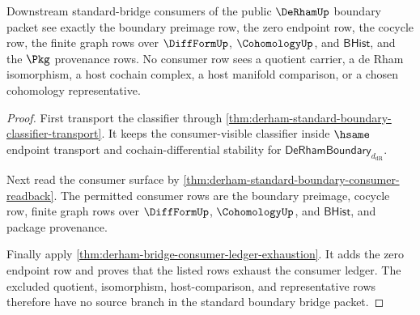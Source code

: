 \begin{theorem}
\label{thm:derham-root-standard-bridge-consumer-threshold}
Downstream standard-bridge consumers of the public $\DeRhamUp$ boundary packet
see exactly the boundary preimage row, the zero endpoint row, the cocycle row,
the finite graph rows over $\DiffFormUp$, $\CohomologyUp$, and $\mathsf{BHist}$,
and the $\Pkg$ provenance rows. No consumer row sees a quotient carrier, a de
Rham isomorphism, a host cochain complex, a host manifold comparison, or a
chosen cohomology representative.
\end{theorem}
\begin{proof}
First transport the classifier through
\autoref{thm:derham-standard-boundary-classifier-transport}. It keeps the
consumer-visible classifier inside $\hsame$ endpoint transport and
cochain-differential stability for
$\mathsf{DeRhamBoundary}_{d_{\mathrm{dR}}}$.

Next read the consumer surface by
\autoref{thm:derham-standard-boundary-consumer-readback}. The permitted
consumer rows are the boundary preimage, cocycle row, finite graph rows over
$\DiffFormUp$, $\CohomologyUp$, and $\mathsf{BHist}$, and package provenance.

Finally apply \autoref{thm:derham-bridge-consumer-ledger-exhaustion}. It adds
the zero endpoint row and proves that the listed rows exhaust the consumer
ledger. The excluded quotient, isomorphism, host-comparison, and representative
rows therefore have no source branch in the standard boundary bridge packet.
\end{proof}
